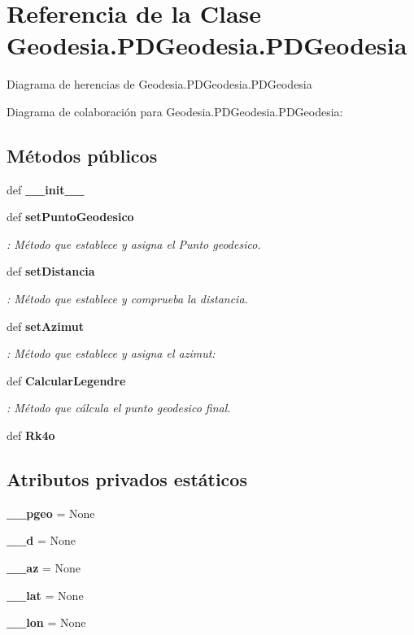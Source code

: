 \section{Referencia de la Clase Geodesia.\-P\-D\-Geodesia.\-P\-D\-Geodesia}
\label{classGeodesia_1_1PDGeodesia_1_1PDGeodesia}


Diagrama de herencias de Geodesia.\-P\-D\-Geodesia.\-P\-D\-Geodesia


Diagrama de colaboración para Geodesia.\-P\-D\-Geodesia.\-P\-D\-Geodesia\-:
\subsection*{Métodos públicos}
\begin{DoxyCompactItemize}
\item 
def {\bf \-\_\-\-\_\-init\-\_\-\-\_\-}
\item 
def {\bf set\-Punto\-Geodesico}
\begin{DoxyCompactList}\small\item\em \-: Método que establece y asigna el Punto geodesico. \end{DoxyCompactList}\item 
def {\bf set\-Distancia}
\begin{DoxyCompactList}\small\item\em \-: Método que establece y comprueba la distancia. \end{DoxyCompactList}\item 
def {\bf set\-Azimut}
\begin{DoxyCompactList}\small\item\em \-: Método que establece y asigna el azimut\-: \end{DoxyCompactList}\item 
def {\bf Calcular\-Legendre}
\begin{DoxyCompactList}\small\item\em \-: Método que cálcula el punto geodesico final. \end{DoxyCompactList}\item 
def {\bf Rk4o}
\end{DoxyCompactItemize}
\subsection*{Atributos privados estáticos}
\begin{DoxyCompactItemize}
\item 
{\bf \-\_\-\-\_\-pgeo} = None
\item 
{\bf \-\_\-\-\_\-d} = None
\item 
{\bf \-\_\-\-\_\-az} = None
\item 
{\bf \-\_\-\-\_\-lat} = None
\item 
{\bf \-\_\-\-\_\-lon} = None
\end{DoxyCompactItemize}


